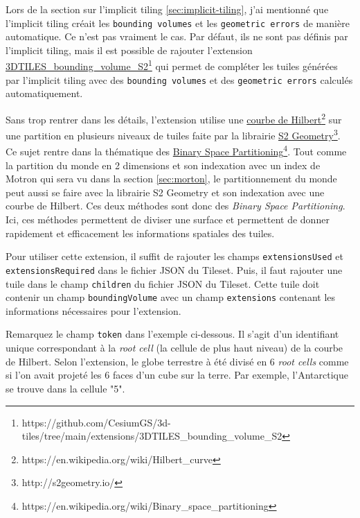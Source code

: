 Lors de la section sur l'implicit tiling \autoref{sec:implicit-tiling}, j'ai mentionné que l'implicit tiling créait les \texttt{bounding volumes} et les \texttt{geometric errors} de manière automatique. Ce n'est pas vraiment le cas. Par défaut, ils ne sont pas définis par l'implicit tiling, mais il est possible de rajouter l'extension \href{https://github.com/CesiumGS/3d-tiles/tree/main/extensions/3DTILES_bounding_volume_S2}{3DTILES\_bounding\_volume\_S2}\footnote{https://github.com/CesiumGS/3d-tiles/tree/main/extensions/3DTILES\_bounding\_volume\_S2} qui permet de compléter les tuiles générées par l'implicit tiling avec des \texttt{bounding volumes} et des \texttt{geometric errors} calculés automatiquement.

Sans trop rentrer dans les détails, l'extension utilise une \href{https://en.wikipedia.org/wiki/Hilbert_curve}{courbe de Hilbert}\footnote{https://en.wikipedia.org/wiki/Hilbert\_curve} sur une partition en plusieurs niveaux de tuiles faite par la librairie \href{http://s2geometry.io/}{S2 Geometry}\footnote{http://s2geometry.io/}. Ce sujet rentre dans la thématique des \href{https://en.wikipedia.org/wiki/Binary_space_partitioning}{Binary Space Partitioning}\footnote{https://en.wikipedia.org/wiki/Binary\_space\_partitioning}. Tout comme la partition du monde en 2 dimensions et son indexation avec un index de Motron qui sera vu dans la section \ref{sec:morton}, le partitionnement du monde peut aussi se faire avec la librairie S2 Geometry et son indexation avec une courbe de Hilbert. Ces deux méthodes sont donc des \textit{Binary Space Partitioning}. Ici, ces méthodes permettent de diviser une surface et permettent de donner rapidement et efficacement les informations spatiales des tuiles.

Pour utiliser cette extension, il suffit de rajouter les champs \texttt{extensionsUsed} et \texttt{extensionsRequired} dans le fichier JSON du Tileset. Puis, il faut rajouter une tuile dans le champ \texttt{children} du fichier JSON du Tileset. Cette tuile doit contenir un champ \texttt{boundingVolume} avec un champ \texttt{extensions} contenant les informations nécessaires pour l'extension.

Remarquez le champ \texttt{token} dans l'exemple ci-dessous. Il s'agit d'un identifiant unique correspondant à la \textit{root cell} (la cellule de plus haut niveau) de la courbe de Hilbert. Selon l'extension, le globe terrestre à été divisé en 6 \textit{root cells} comme si l'on avait projeté les 6 faces d'un cube sur la terre. Par exemple, l'Antarctique se trouve dans la cellule "5".

